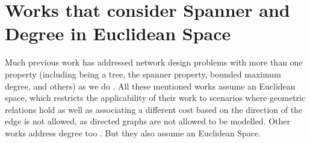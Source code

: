 \section{Works that consider Spanner and Degree in Euclidean Space}
\label{sec:euclidean_space}
Much previous work has addressed network design problems with more than one property (including being a tree, the spanner property, bounded maximum degree, and others) 
as we do \cite{Arya1995,Dinitz2008,Kortsarz1999}. All these mentioned works assume an Euclidean space, which restricts the applicability of their work 
to scenarios where geometric relations hold as well as associating a different cost based on the direction of the edge is not allowed, as directed graphs are not allowed to be modelled. 
Other works address degree too \cite{Chan2003,Fekete1997,Monma1991,Lukovszki1999,Farshi2007,Lukovszki2006,Grunewald2002}. But they also assume an Euclidean Space.



